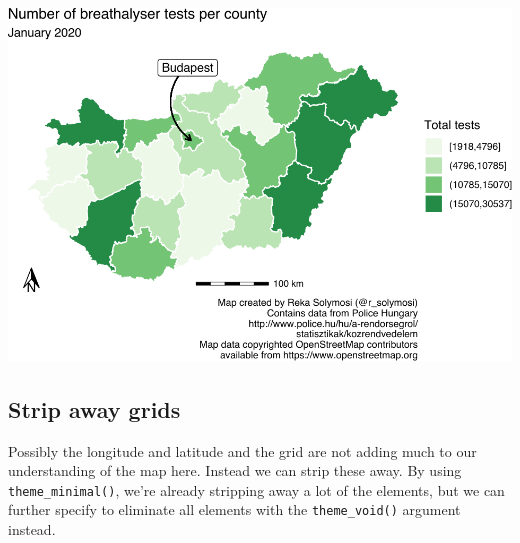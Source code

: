 \documentclass[
]{book}
\begin{document}
\includegraphics{crime_mapping_files/figure-latex/scale-1.pdf}

\hypertarget{strip-away-grids}{%
\subsection{Strip away grids}\label{strip-away-grids}}

Possibly the longitude and latitude and the grid are not adding much to our understanding of the map here. Instead we can strip these away. By using \texttt{theme\_minimal()}, we're already stripping away a lot of the elements, but we can further specify to eliminate all elements with the \texttt{theme\_void()} argument instead.
\end{document}
